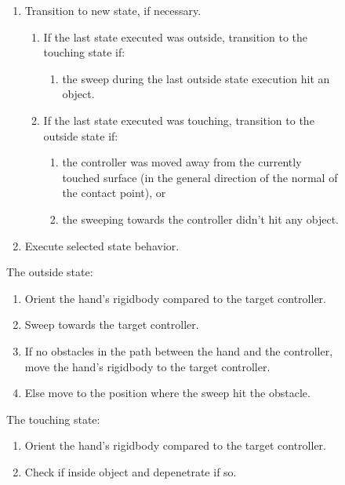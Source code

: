 \begin{figure}[H]
\small
\begin{enumerate}
\item Transition to new state, if necessary.
\begin{enumerate}[noitemsep,label=\alph*.]
\item If the last state executed was outside, transition to the touching state if:
\begin{enumerate}[noitemsep,label=\arabic*.]
\item the sweep during the last outside state execution hit an object.
\end{enumerate}
\item If the last state executed was touching, transition to the outside state if:
\begin{enumerate}[noitemsep,label=\arabic*.]
\item the controller was moved away from the currently touched surface (in the general direction of the normal of the contact point), or
\item the sweeping towards the controller didn't hit any object.
\end{enumerate}
\end{enumerate}
\item Execute selected state behavior.
\end{enumerate}
\begin{minipage}[t]{0.49\textwidth}
\small
The outside state:
\begin{enumerate}[noitemsep]
\item Orient the hand's rigidbody compared to the target controller.
\item Sweep towards the target controller.
\item If no obstacles in the path between the hand and the controller, move the hand's rigidbody to the target controller.
\item Else move to the position where the sweep hit the obstacle.
\end{enumerate}
\end{minipage}
\hspace{2em}%
\begin{minipage}[t]{0.49\textwidth}
\small
The touching state:
\begin{enumerate}[noitemsep]
\item Orient the hand's rigidbody compared to the target controller.
\item Check if inside object and depenetrate if so.

\end{enumerate}
\end{minipage}
\end{figure}
